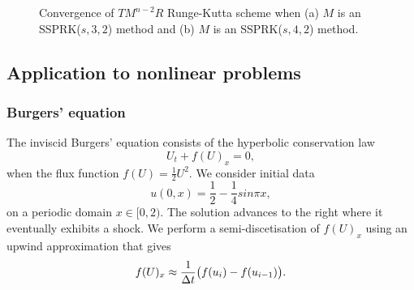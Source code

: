 \begin{figure}
	\centering
    \caption{Convergence of $TM^{n-2}R$ Runge-Kutta scheme when (a) $M$ 
    is an SSPRK($s,3,2$) method and (b) $ M $ is an SSPRK($s,4,2$) method.}
    \label{fig:conv_study}
\end{figure}

\subsection{Application to nonlinear problems}\label{subsec:nonlinear_problems}
\subsubsection{Burgers' equation}\label{subsubsec:burgers}
The inviscid Burgers' equation consists of the hyperbolic conservation law
\begin{equation}\label{eq:HCL}
    U_{t} + f(U)_{x} = 0,
\end{equation}
when the flux function $f(U) = \frac{1}{2}U^{2}$. 
We consider initial data
\begin{equation}\label{eq:burgers_IC}
    u(0,x)  = \frac{1}{2} - \frac{1}{4}sin{\pi x},
\end{equation}
on a periodic domain $x \in [0,2)$. 
The solution advances to the right where it eventually exhibits a shock. 
We perform a semi-discetisation of $f(U)_{x}$ using an upwind approximation 
\cite{Ketcheson2009} that gives
\begin{equation}\label{eq:burgers_flux}
    f(U)_{x} \approx \frac{1}{\Delta t}\bigl(f(u_{i}) - f(u_{i-1})\bigr).
\end{equation}

